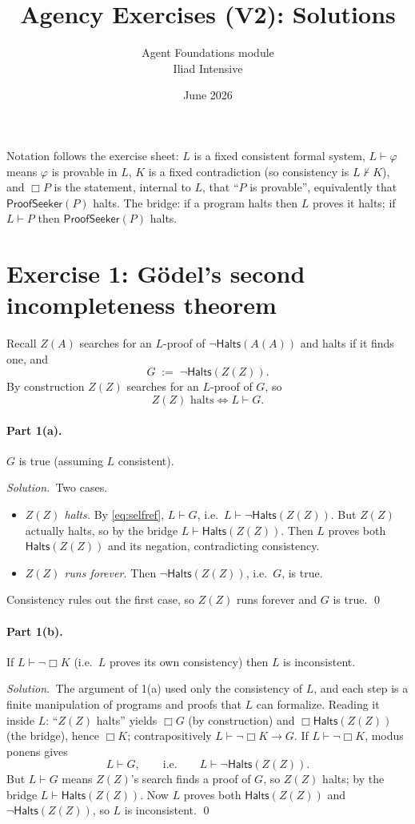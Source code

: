 \documentclass[11pt]{article}
\title{Agency Exercises (V2): Solutions}
\author{Agent Foundations module \\ Iliad Intensive}
\date{June 2026}
\newcommand{\proves}{\vdash}
\newcommand{\Halts}{\mathsf{Halts}}
\newcommand{\PS}{\mathsf{ProofSeeker}}
\newcommand{\bx}{\Box}
\theoremstyle{plain}
\newcommand{\soln}{\medskip\noindent\textit{Solution.}\ }
\begin{document}
\maketitle

\noindent
Notation follows the exercise sheet: $L$ is a fixed consistent formal system, $L\proves\varphi$ means $\varphi$ is provable in $L$, $K$ is a fixed contradiction (so consistency is $L\nvdash K$), and $\bx P$ is the statement, internal to $L$, that ``$P$ is provable'', equivalently that $\PS(P)$ halts. The bridge: if a program halts then $L$ proves it halts; if $L\proves P$ then $\PS(P)$ halts.

\section{Exercise 1: G\"odel's second incompleteness theorem}

Recall $Z(A)$ searches for an $L$-proof of $\neg\Halts(A(A))$ and halts if it finds one, and
\[
  G \;:=\; \neg\Halts(Z(Z)).
\]
By construction $Z(Z)$ searches for an $L$-proof of $G$, so
\begin{equation}\label{eq:selfref}
  Z(Z)\text{ halts} \iff L\proves G. \tag{$\star$}
\end{equation}

\paragraph{Part 1(a).} $G$ is true (assuming $L$ consistent).

\soln Two cases.
\begin{itemize}[leftmargin=1.5em]
\item \emph{$Z(Z)$ halts.} By \eqref{eq:selfref}, $L\proves G$, i.e.\ $L\proves\neg\Halts(Z(Z))$. But $Z(Z)$ actually halts, so by the bridge $L\proves\Halts(Z(Z))$. Then $L$ proves both $\Halts(Z(Z))$ and its negation, contradicting consistency.
\item \emph{$Z(Z)$ runs forever.} Then $\neg\Halts(Z(Z))$, i.e.\ $G$, is true.
\end{itemize}
Consistency rules out the first case, so $Z(Z)$ runs forever and $G$ is true. \qed

\paragraph{Part 1(b).} If $L\proves\neg\bx K$ (i.e.\ $L$ proves its own consistency) then $L$ is inconsistent.

\soln The argument of 1(a) used only the consistency of $L$, and each step is a finite manipulation of programs and proofs that $L$ can formalize. Reading it inside $L$: ``$Z(Z)$ halts'' yields $\bx G$ (by construction) and $\bx\Halts(Z(Z))$ (the bridge), hence $\bx K$; contrapositively $L\proves \neg\bx K \to G$. If $L\proves\neg\bx K$, modus ponens gives
\[
  L\proves G,\qquad\text{i.e.}\qquad L\proves\neg\Halts(Z(Z)).
\]
But $L\proves G$ means $Z(Z)$'s search finds a proof of $G$, so $Z(Z)$ halts; by the bridge $L\proves\Halts(Z(Z))$. Now $L$ proves both $\Halts(Z(Z))$ and $\neg\Halts(Z(Z))$, so $L$ is inconsistent. \qed
\end{document}
